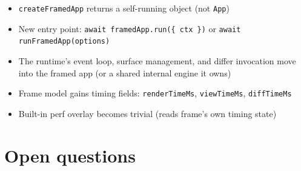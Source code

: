 \begin{itemize}
\tightlist
\item
  \texttt{c\allowbreak{}r\allowbreak{}e\allowbreak{}a\allowbreak{}t\allowbreak{}e\allowbreak{}F\allowbreak{}r\allowbreak{}a\allowbreak{}m\allowbreak{}e\allowbreak{}d\allowbreak{}A\allowbreak{}p\allowbreak{}p} returns a self-running object (not \texttt{A\allowbreak{}p\allowbreak{}p})
\item
  New entry point: \texttt{a\allowbreak{}w\allowbreak{}a\allowbreak{}i\allowbreak{}t\allowbreak{} \allowbreak{}f\allowbreak{}r\allowbreak{}a\allowbreak{}m\allowbreak{}e\allowbreak{}d\allowbreak{}A\allowbreak{}p\allowbreak{}p\allowbreak{}.\allowbreak{}r\allowbreak{}u\allowbreak{}n\allowbreak{}(\allowbreak{}\{\allowbreak{} \allowbreak{}c\allowbreak{}t\allowbreak{}x\allowbreak{} \allowbreak{}\}\allowbreak{})} or \texttt{a\allowbreak{}w\allowbreak{}a\allowbreak{}i\allowbreak{}t\allowbreak{} \allowbreak{}r\allowbreak{}u\allowbreak{}n\allowbreak{}F\allowbreak{}r\allowbreak{}a\allowbreak{}m\allowbreak{}e\allowbreak{}d\allowbreak{}A\allowbreak{}p\allowbreak{}p\allowbreak{}(\allowbreak{}o\allowbreak{}p\allowbreak{}t\allowbreak{}i\allowbreak{}o\allowbreak{}n\allowbreak{}s\allowbreak{})}
\item
  The runtime's event loop, surface management, and differ invocation move into the framed app (or a shared internal engine it owns)
\item
  Frame model gains timing fields: \texttt{r\allowbreak{}e\allowbreak{}n\allowbreak{}d\allowbreak{}e\allowbreak{}r\allowbreak{}T\allowbreak{}i\allowbreak{}m\allowbreak{}e\allowbreak{}M\allowbreak{}s}, \texttt{v\allowbreak{}i\allowbreak{}e\allowbreak{}w\allowbreak{}T\allowbreak{}i\allowbreak{}m\allowbreak{}e\allowbreak{}M\allowbreak{}s}, \texttt{d\allowbreak{}i\allowbreak{}f\allowbreak{}f\allowbreak{}T\allowbreak{}i\allowbreak{}m\allowbreak{}e\allowbreak{}M\allowbreak{}s}
\item
  Built-in perf overlay becomes trivial (reads frame's own timing state)
\end{itemize}

\section{Open questions}\label{record-372-open-questions}

